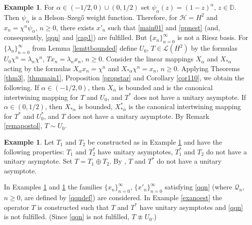\documentclass[a4paper,oneside,11pt]{amsart}
\numberwithin{equation}{section}
\theoremstyle{plain}
\theoremstyle{definition}
\newtheorem{example}[theorem]{Example}
\begin{document}
\begin{example}\label{exapsi}
For $\alpha\in(-1/2,0)\cup(0,1/2)$ set $\psi_\alpha(z)=(1-z)^\alpha$, $z\in\mathbb D$.
Then $\psi_\alpha$ is a Helson--Szeg\H o weight function. Therefore, for $\mathcal H=H^2$ and $x_n=\chi^n\psi_\alpha$,  $n\geq 0$, 
there exists $x'_n$ such that \eqref{main01} and \eqref{ppnest} (and, consequently, \eqref{qqn} and \eqref{cap1}) are fulfilled. 
But $\{x_n\}_{n=0}^\infty$ is not a Riesz basis.
For $\{\lambda_n\}_{n=0}^\infty$ from Lemma \ref{lemttbounded} 
define $U_0$, $T\in\mathcal L(H^2)$ by the formulas $U_0 \chi^n=\lambda_n\chi^n$, $Tx_n=\lambda_nx_n$, $n\geq 0$.  
Consider the linear mappings $X_\alpha$ and $X_{*\alpha}$ acting by the formulas 
$X _\alpha x_n=\chi^n$ and $X_{*\alpha}\chi^n=x_n$, $n\geq 0$. Applying Theorems \ref{thm3}, \ref{thmmain1}, 
Proposition \ref{propstar} and Corollary \ref{cor110},  we obtain the following. 
If $\alpha\in(-1/2,0)$, then 
$X_\alpha$ is bounded and is the canonical intertwining mapping  for $T$ and $U_0$, and $T^*$ does not have a unitary asymptote. 
If $\alpha\in(0,1/2)$, then 
$X_{*\alpha}$ is bounded,  $X_{*\alpha}^*$  is the canonical intertwining mapping  for $T^*$ and $U_0^*$, and $T$ 
does not have a unitary asymptote. By Remark \ref{remapostol}, $T\sim U_0$. 
\end{example}


\begin{example}\label{exanet} Let $T_1$ and $T_2$ be constructed as in Example \ref{exapsi} and have the following properties: 
$T_1$ and $T_2^*$ have unitary asymptotes,  $T_1^*$ and $T_2$ do not have a unitary asymptote. Set $T=T_1\oplus T_2$. By  {\cite[Proposition 13]{kerntuple}}, 
$T$ and $T^*$ do not have a unitary asymptote. 
\end{example}

In Examples \ref{exapsi} and \ref{exanet} the families $\{x_n\}_{n=0}^\infty$, $\{x'_n\}_{n=0}^\infty$ satisfying  \eqref{qqn} 
(where $\mathcal Q_n$, $n\geq 0$,  are defined by \eqref{qqndef}) 
are considered. In Example \ref{exanoest} the operator $T$ is constructed such that $T$ and $T^*$ have unitary asymptotes 
and \eqref{qqn} is not fulfilled. (Since \eqref{qqn} is not fulfilled, $T\not\approx U_0$.)
\end{document}
